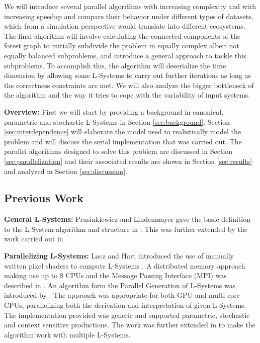 \documentclass[letterpaper,twoside,11pt]{article}
\begin{document}
\begin{multicols}{2}
We will introduce several parallel algorithms with increasing complexity and with increasing speedup and compare their behavior under different types of datasets, which from a simulation perspective would translate into different ecosystems. The final algorithm will involve calculating the connected components of the forest graph to initially subdivide the problem in equally complex albeit not equally balanced subproblems, and introduce a general approach to tackle this subproblems. To accomplish this, the algorithm will deserialize the time dimension by allowing some L-Systems to carry out further iterations as long as the correctness constraints are met. We will also analyze the bigger bottleneck of the algorithm and the way it tries to cope with the variability of input systems.

\textbf{Overview:} First  we will start by providing a background in canonical, parametric and stochastic L-Systems in Section \ref{sec:background}. Section \ref{sec:interdependence} will elaborate the model used to realistically model the problem and will discuss the serial implementation that was carried out. The parallel algorithms designed to solve this problem are discussed in Section \ref{sec:parallelization} and their associated results are shown in Section \ref{sec:results} and analyzed in Section \ref{sec:discussion}.

\subsection{Previous Work} %
\label{sub:previous_work}
\textbf{General L-Systems:} Prusinkiewicz and Lindenmayer gave the basic definition to the L-System algorithm and structure in \cite{Prusinkiewicz:1996:ABP:235579}. This was further extended by the work carried out in \cite{Parish:2001:PMC:383259.383292,Prusinkiewicz:1994:ST:192161.192254,Prusinkiewicz:2001:UPI:383259.383291}

\textbf{Parallelizing L-Systems:} Lacz and Hart introduced the use of manually written pixel shaders to compute L-Systems \cite{Lacz04proceduralgeometry}. A distributed memory approach making use up to 8 CPUs and the Message Passing Interface (MPI) was described in \cite{4392608}. An algorithm form the Parallel Generation of L-Systems was introduced by \cite{LIPP-2009-PGL}. The approach was appropriate for both GPU and multi-core CPUs, parallelizing both the derivation and interpretation of given L-Systems. The implementation provided was generic and supported parametric, stochastic and context sensitive productions. The work was further extended in \cite{LIPP-2010-PGMS} to make the algorithm work with multiple L-Systems.


\end{multicols}
\end{document}
